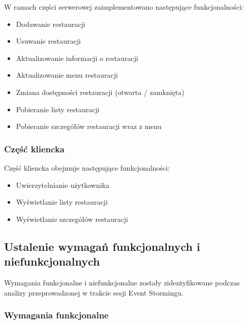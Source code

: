 W ramach części serwerowej zaimplementowano następujące funkcjonalności:

\begin{itemize}
    \item Dodawanie restauracji
    \item Usuwanie restauracji
    \item Aktualizowanie informacji o restauracji
    \item Aktualizowanie menu restauracji
    \item Zmiana dostępności restauracji (otwarta / zamknięta)
    \item Pobieranie listy restauracji
    \item Pobieranie szczegółów restauracji wraz z menu
\end{itemize}

\subsubsection{Część kliencka}

Część kliencka obejmuje następujące funkcjonalności:

\begin{itemize}
    \item Uwierzytelnianie użytkownika
    \item Wyświetlanie listy restauracji
    \item Wyświetlanie szczegółów restauracji
\end{itemize}

\subsection{Ustalenie wymagań funkcjonalnych i niefunkcjonalnych}

Wymagania funkcjonalne i niefunkcjonalne zostały zidentyfikowane podczas analizy przeprowadzonej w trakcie sesji Event Stormingu.

\subsubsection{Wymagania funkcjonalne}

